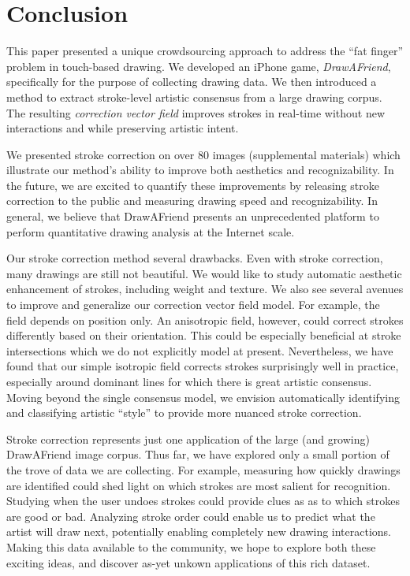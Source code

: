 \section{Conclusion}

This paper presented a unique crowdsourcing approach to address the
``fat finger'' problem in touch-based drawing. We developed an
iPhone game, \emph{DrawAFriend}, specifically for the purpose of
collecting drawing data. We then introduced a method to extract
stroke-level artistic consensus from a large drawing corpus. The
resulting \emph{correction vector field} improves strokes in
real-time without new interactions and while preserving artistic
intent.

We presented stroke correction on over 80 images (supplemental
materials) which illustrate our method's ability to improve both
aesthetics and recognizability. In the future, we are excited to
quantify these improvements by releasing stroke correction to the
public and measuring drawing speed and recognizability. In general,
we believe that DrawAFriend presents an unprecedented platform to
perform quantitative drawing analysis at the Internet scale.

Our stroke correction method several drawbacks. Even with stroke
correction, many drawings are still not beautiful. We would like to
study automatic aesthetic enhancement of strokes, including weight
and texture. We also see several avenues to improve and generalize
our correction vector field model. For example, the field depends on
position only. An anisotropic field, however, could correct strokes
differently based on their orientation. This could be especially
beneficial at stroke intersections which we do not explicitly model
at present. Nevertheless, we have found that our simple isotropic
field corrects strokes surprisingly well in practice, especially
around dominant lines for which there is great artistic consensus.
Moving beyond the single consensus model, we envision automatically
identifying and classifying artistic ``style'' to provide more
nuanced stroke correction.

Stroke correction represents just one application of the large (and
growing) DrawAFriend image corpus. Thus far, we have explored only a
small portion of the trove of data we are collecting. For example,
measuring how quickly drawings are identified could shed light on
which strokes are most salient for recognition. Studying when the
user undoes strokes could provide clues as as to which strokes are
good or bad. Analyzing stroke order could enable us to predict what
the artist will draw next, potentially enabling completely new
drawing interactions. Making this data available to the community,
we hope to explore both these exciting ideas, and discover as-yet
unkown applications of this rich dataset.

